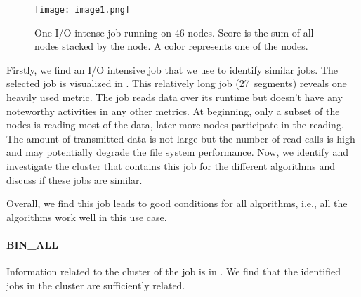 \documentclass{jhps}
\begin{document}
\begin{figure}
  \centering
  \texttt{[image: image1.png]}
  \caption{One I/O-intense job running on 46 nodes.
Score is the sum of all nodes stacked by the node.
A color represents one of the nodes.}
  \label{fig:use_case}
\end{figure}

Firstly, we find an I/O intensive job that we use to identify similar jobs.
The selected job is visualized in .
This relatively long job (27~segments) reveals one heavily used metric.
The job reads data over its runtime but doesn't have any noteworthy activities in any other metrics.
At beginning, only a subset of the nodes is reading most of the data, later more nodes participate in the reading.
The amount of transmitted data is not large but the number of read calls is high and may potentially degrade the file system performance.
Now, we identify and investigate the cluster that contains this job for the different algorithms and discuss if these jobs are similar.

Overall, we find this job leads to good conditions for all algorithms, i.e., all the algorithms work well in this use case.

\FloatBarrier
\paragraph{BIN\_ALL}
Information related to the cluster of the job is in .
We find that the identified jobs in the cluster are sufficiently related.
\end{document}
